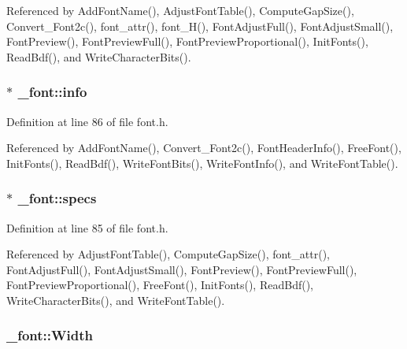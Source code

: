 Referenced by Add\+Font\+Name(), Adjust\+Font\+Table(), Compute\+Gap\+Size(), Convert\+\_\+\+Font2c(), font\+\_\+attr(), font\+\_\+\+H(), Font\+Adjust\+Full(), Font\+Adjust\+Small(), Font\+Preview(), Font\+Preview\+Full(), Font\+Preview\+Proportional(), Init\+Fonts(), Read\+Bdf(), and Write\+Character\+Bits().

\subsubsection[{\texorpdfstring{info}{info}}]{ $\ast$ \+\_\+font\+::info}\hypertarget{struct__font_abf134e8a44e707d3b4e83ab76c952ed9}{}\label{struct__font_abf134e8a44e707d3b4e83ab76c952ed9}


Definition at line 86 of file font.\+h.



Referenced by Add\+Font\+Name(), Convert\+\_\+\+Font2c(), Font\+Header\+Info(), Free\+Font(), Init\+Fonts(), Read\+Bdf(), Write\+Font\+Bits(), Write\+Font\+Info(), and Write\+Font\+Table().

\subsubsection[{\texorpdfstring{specs}{specs}}]{ $\ast$ \+\_\+font\+::specs}\hypertarget{struct__font_a76b5b07cf75a869627eca27d7a32836a}{}\label{struct__font_a76b5b07cf75a869627eca27d7a32836a}


Definition at line 85 of file font.\+h.



Referenced by Adjust\+Font\+Table(), Compute\+Gap\+Size(), font\+\_\+attr(), Font\+Adjust\+Full(), Font\+Adjust\+Small(), Font\+Preview(), Font\+Preview\+Full(), Font\+Preview\+Proportional(), Free\+Font(), Init\+Fonts(), Read\+Bdf(), Write\+Character\+Bits(), and Write\+Font\+Table().

\subsubsection[{\texorpdfstring{Width}{Width}}]{ \+\_\+font\+::\+Width}\hypertarget{struct__font_ae3d3b48670f1bf4bf6dbf42794f81b31}{}\label{struct__font_ae3d3b48670f1bf4bf6dbf42794f81b31}


